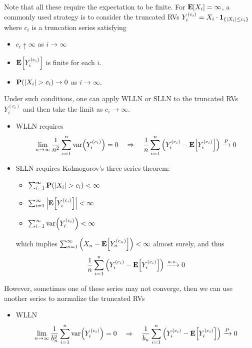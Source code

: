 \begin{remark}
    Note that all these require the expectation to be finite. For $\mathbf{E}[X_i] = \infty$, a commonly used strategy is to consider the truncated RVs $Y_i^{(c_i)} = X_i \cdot \mathbf{1}_{\{\abs{X_i} \leq c_i\}}$ where $c_i$ is a truncation series satisfying 
    \begin{itemize}
        \item $c_i \uparrow \infty$ as $i \to \infty$
        \item $\mathbf{E}\qty[Y_i^{(c_i)}]$ is finite for each $i$.
        \item $\mathbf{P}(\abs{X_i} > c_i) \to 0$ as $i \to \infty$.
    \end{itemize}
    Under such conditions, one can apply WLLN or SLLN to the truncated RVs $Y_i^{(c_i)}$ and then take the limit as $c_i \to \infty$.
    \begin{itemize}
        \item WLLN requires
        \begin{equation}
            \lim_{n \to \infty} \frac{1}{n^2} \sum_{i=1}^{n} \mathrm{var}\qty(Y_i^{(c_i)}) = 0 \quad\Rightarrow\quad \frac{1}{n} \sum_{i=1}^{n} \qty(Y_i^{(c_i)} - \mathbf{E}\qty[Y_i^{(c_i)}]) \xrightarrow{P} 0
        \end{equation}
        \item SLLN requires Kolmogorov's three series theorem: \begin{itemize}
            \item $\sum_{i=1}^{\infty} \mathbf{P}(\abs{X_i} > c_i) < \infty$
            \item $\sum_{i=1}^{\infty} \abs{\mathbf{E}\qty[Y_i^{(c_i)}]} < \infty$
            \item $\sum_{i=1}^{\infty} \mathrm{var}\qty(Y_i^{(c_i)}) < \infty$
        \end{itemize}
        which implies $\sum_{n=1}^{\infty} \qty(X_n - \mathbf{E}\qty[Y_n^{(c_n)}]) < \infty$ almost surely, and thus
        \begin{equation}
            \frac{1}{n} \sum_{i=1}^{n} \qty(Y_i^{(c_i)} - \mathbf{E}\qty[Y_i^{(c_i)}]) \xrightarrow{a.s.} 0
        \end{equation}
    \end{itemize}
    However, sometimes one of these series may not converge, then we can use another series to normalize the truncated RVs
    \begin{itemize}
        \item WLLN
        \begin{equation}
            \lim_{n \to \infty} \frac{1}{b_n^2} \sum_{i=1}^{n} \var\qty(Y_i^{(c_i)}) = 0 \quad\Rightarrow\quad \frac{1}{b_n} \sum_{i=1}^{n} \qty(Y_i^{(c_i)} - \E\qty[Y_i^{(c_i)}]) \xrightarrow{P} 0

\end{equation}
\end{itemize}
\end{remark}
